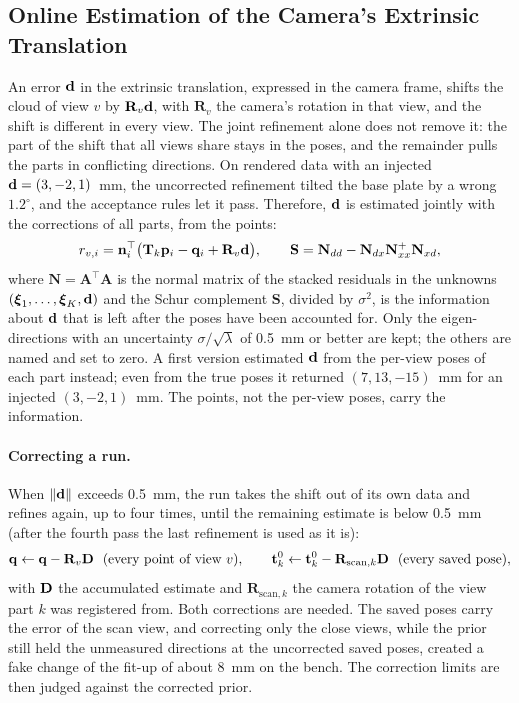 \subsection{Online Estimation of the Camera's Extrinsic Translation}
\label{sec:mv_selfcal}
An error $\mathbf{d}$ in the extrinsic translation, expressed in the camera frame, shifts the cloud of
view $v$ by $\mathbf{R}_v\mathbf{d}$, with $\mathbf{R}_v$ the camera's rotation in that view, and the
shift is different in every view. The joint refinement alone does not remove it: the part of the
shift that all views share stays in the poses, and the remainder pulls the parts in conflicting
directions. On rendered data with an injected $\mathbf{d}=(3,-2,1)$~mm, the uncorrected refinement
tilted the base plate by a wrong $1.2^\circ$, and the acceptance rules let it pass. Therefore,
$\mathbf{d}$ is estimated jointly with the corrections of all parts, from the points:
\begin{equation}
r_{v,i} = \mathbf{n}_i^{\top}\big(\mathbf{T}_k\mathbf{p}_i - \mathbf{q}_i + \mathbf{R}_v\mathbf{d}\big),
\qquad
\mathbf{S} = \mathbf{N}_{dd} - \mathbf{N}_{dx}\mathbf{N}_{xx}^{+}\mathbf{N}_{xd},
\label{eq:extrinsic_d}
\end{equation}
where $\mathbf{N}=\mathbf{A}^{\top}\mathbf{A}$ is the normal matrix of the stacked residuals in the
unknowns $(\boldsymbol{\xi}_1,\dots,\boldsymbol{\xi}_K,\mathbf{d})$ and the Schur complement $\mathbf{S}$,
divided by $\sigma^2$, is the information about $\mathbf{d}$ that is left after the poses have been
accounted for. Only the eigen-directions with an uncertainty $\sigma/\sqrt{\lambda}$ of 0.5~mm or better
are kept; the others are
named and set to zero. A first version estimated $\mathbf{d}$ from the per-view poses of each part
instead; even from the true poses it returned $(7,13,-15)$~mm for an injected $(3,-2,1)$~mm. The
points, not the per-view poses, carry the information.

\paragraph{Correcting a run.} When $\left\lVert\mathbf{d}\right\rVert$ exceeds 0.5~mm, the run takes the shift out of
its own data and refines again, up to four times, until the remaining estimate is below 0.5~mm (after
the fourth pass the last refinement is used as it is):
\begin{equation}
\vect{q}\leftarrow\vect{q}-\mathbf{R}_v\vect{D}\ \ \text{(every point of view $v$)},\qquad
\vect{t}_k^{0}\leftarrow\vect{t}_k^{0}-\mathbf{R}_{\mathrm{scan},k}\vect{D}\ \ \text{(every saved pose)},
\label{eq:selfcal_apply}
\end{equation}
with $\mathbf{D}$ the accumulated estimate and $\mathbf{R}_{\mathrm{scan},k}$ the camera rotation of the
view part $k$ was registered from. Both corrections are needed. The saved poses carry the error of the
scan view, and correcting only the close views, while the prior still held the unmeasured
directions at the uncorrected saved poses, created a fake change of the fit-up of about 8~mm on the
bench. The correction limits are then judged against the corrected prior.

